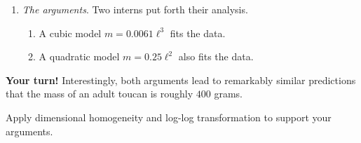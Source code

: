 \documentclass[../main.tex]{subfiles}
\begin{document}
\begin{example}
\begin{enumerate}[wide, label=(\arabic*)]
    \item \emph{The arguments}. Two interns put forth their analysis. 
      \begin{enumerate}[wide, label=Intern \Alph*:]
        \item A cubic model \(m = 0.0061 \ell^{3}\) fits the data.
        \item A quadratic model \(m = 0.25 \ell^{2}\) also fits the data.
      \end{enumerate}

      
      
  \end{enumerate}

  \medskip
  \begin{mdframed}[roundcorner=10pt]
    \textbf{Your turn!} Interestingly, both arguments lead to remarkably similar predictions that the mass of an adult toucan is roughly \(400\) grams.
    \begin{center}
    \end{center}

    Apply dimensional homogeneity and log-log transformation to support your arguments.
  \end{mdframed}
\end{example}
\end{document}

